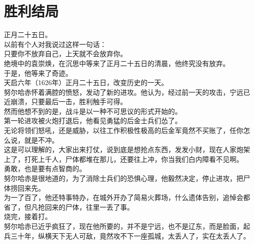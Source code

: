 \section{胜利结局}
\ifnum{}
	\begin{multicols}{\theparacolNo}
\fi
正月二十五日。\\

以前有个人对我说过这样一句话：\\

只要你不放弃自己，上天就不会放弃你。\\

绝境中的袁崇焕，在沉思中等来了正月二十五日的清晨，他终究没有放弃。\\

于是，他等来了奇迹。\\

天启六年（1626年）正月二十五日，改变历史的一天。\\

努尔哈赤怀着满腔的愤怒，发动了新的进攻。他认为，经过前一天的攻击，宁远已近崩溃，只要最后一击，胜利触手可得。\\

然而他想不到的是，战斗是以一种不可思议的形式开始的。\\

第一轮进攻被火炮打退后，他看见勇猛的后金士兵们怂了。\\

无论将领们怒吼，还是威胁，以往工作积极性极高的后金军竟然不买账了，任你怎么说，就是不冲。\\

这是可以理解的，大家出来打仗，说到底是想抢点东西，发发小财，现在人家炮架上了，打死上千人，尸体都堆在那儿，还要往上冲，你当我们白内障看不见啊。\\

勇敢，也是要有点智商的。\\

努尔哈赤是很地道的，为了消除士兵们的恐惧心理，他毅然决定，停止进攻，把尸体捞回来先。\\

为一了百了，他还特事特办，在城外开办了简易火葬场，什么遗体告别，追悼会都省了，但凡抢回来的尸体，往里一丢了事。\\

烧完，接着打。\\

努尔哈赤已近乎疯狂了，现在他所要的，并不是宁远，也不是辽东，而是脸面，起兵三十年，纵横天下无人可敌，竟然攻不下一座孤城，太丢人了，实在太丢人了。\\


\end{multicols}
